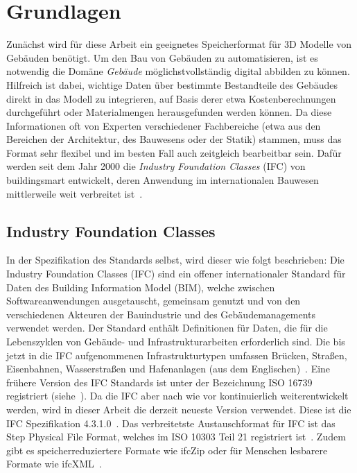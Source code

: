 \chapter{Grundlagen}
\label{basics}
Zunächst wird für diese Arbeit ein geeignetes Speicherformat für 3D Modelle von Gebäuden benötigt.
Um den Bau von Gebäuden zu automatisieren, ist es notwendig die Domäne \textit{Gebäude} möglichstvollständig digital abbilden zu können. 
Hilfreich ist dabei, wichtige Daten über bestimmte Bestandteile des Gebäudes direkt in das Modell zu integrieren, auf Basis derer etwa Kostenberechnungen durchgeführt oder Materialmengen herausgefunden werden können.
Da diese Informationen oft von Experten verschiedener Fachbereiche (etwa aus den Bereichen der Architektur, des Bauwesens oder der Statik) stammen, muss das Format sehr flexibel und im besten Fall auch zeitgleich bearbeitbar sein.
Dafür werden seit dem Jahr 2000 die \textit{Industry Foundation Classes} (IFC) von buildingsmart entwickelt, deren Anwendung im internationalen Bauwesen mittlerweile weit verbreitet ist~\cite{Industry61:online}.


\section{Industry Foundation Classes}
\label{basics:ifc}
In der Spezifikation des Standards selbst, wird dieser wie folgt beschrieben:
\glqq{}Die Industry Foundation Classes (IFC) sind ein offener internationaler Standard für Daten des Building Information Model (BIM), welche zwischen Softwareanwendungen ausgetauscht, gemeinsam genutzt und von den verschiedenen Akteuren der Bauindustrie und des Gebäudemanagements verwendet werden. 
Der Standard enthält Definitionen für Daten, die für die Lebenszyklen von Gebäude- und Infrastrukturarbeiten erforderlich sind. 
Die bis jetzt in die IFC aufgenommenen Infrastrukturtypen umfassen Brücken, Straßen, Eisenbahnen, Wasserstraßen und Hafenanlagen\grqq{} (aus dem Englischen)~\cite{IFCScope:online}. 
Eine frühere Version des IFC Standards ist unter der Bezeichnung ISO 16739 registriert (siehe~\cite{ISOISO1694:online}).
Da die IFC aber nach wie vor kontinuierlich weiterentwickelt werden, wird in dieser Arbeit die derzeit neueste Version verwendet.
Diese ist die IFC Spezifikation 4.3.1.0~\cite{IFC4310Spezification:online}.
Das verbreitetste Austauschformat für IFC ist das Step Physical File Format, welches im ISO 10303 Teil 21 registriert ist~\cite{ISO_Step:online}.
Zudem gibt es speicherreduziertere Formate wie ifcZip oder für Menschen lesbarere Formate wie ifcXML~\cite{Industry93:online}\cite{IFCForma28:online}.

